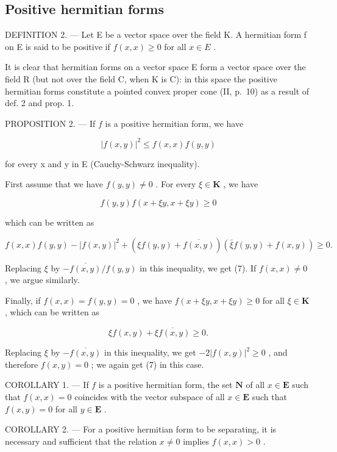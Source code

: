 \subsection{Positive hermitian forms}

DEFINITION 2. --- Let E be a vector space over the field K. A hermitian form f on E is said to be positive if \(f(x, x) \geqslant 0\) for all \(x \in E\) .

It is clear that hermitian forms on a vector space E form a vector space over the field R (but not over the field C, when K is C): in this space the positive hermitian forms constitute a pointed convex proper cone (II, p.~10) as a result of def. 2 and prop. 1.

PROPOSITION 2. --- If \(f\) is a positive hermitian form, we have

\[
\left| f (x, y) \right| ^ {2} \leqslant f (x, x) f (y, y)\tag{7}
\]

for every x and y in E (Cauchy-Schwarz inequality).

First assume that we have \(f(y, y) \neq 0\) . For every \(\xi \in \mathbf{K}\) , we have

\[
f (y, y) f (x + \xi y, x + \xi y) \geqslant 0
\]

which can be written as

\[
f (x, x) f (y, y) - | f (x, y) | ^ {2} + (\xi f (y, y) + \overline {{f (x , y)}}) (\bar {\xi} f (y, y) + f (x, y)) \geqslant 0.
\]

Replacing \(\xi\) by \(-\overline{f(x,y)} / f(y,y)\) in this inequality, we get (7). If \(f(x,x)\neq 0\) , we argue similarly.

Finally, if \(f(x, x) = f(y, y) = 0\) , we have \(f(x + \xi y, x + \xi y) \geqslant 0\) for all \(\xi \in \mathbf{K}\) , which can be written as

\[
\xi f (x, y) + \overline {{{{\xi f (x , y)}}}} \geqslant 0.
\]

Replacing \(\xi\) by \(-\overline{f(x,y)}\) in this inequality, we get \(-2|f(x,y)|^2 \geqslant 0\) , and therefore \(f(x,y) = 0\) ; we again get (7) in this case.

COROLLARY 1. --- If \(f\) is a positive hermitian form, the set \(\mathbf{N}\) of all \(x \in \mathbf{E}\) such that \(f(x, x) = 0\) coincides with the vector subspace of all \(x \in \mathbf{E}\) such that \(f(x, y) = 0\) for all \(y \in \mathbf{E}\) .

COROLLARY 2. --- For a positive hermitian form to be separating, it is necessary and sufficient that the relation \(x \neq 0\) implies \(f(x, x) > 0\) .

